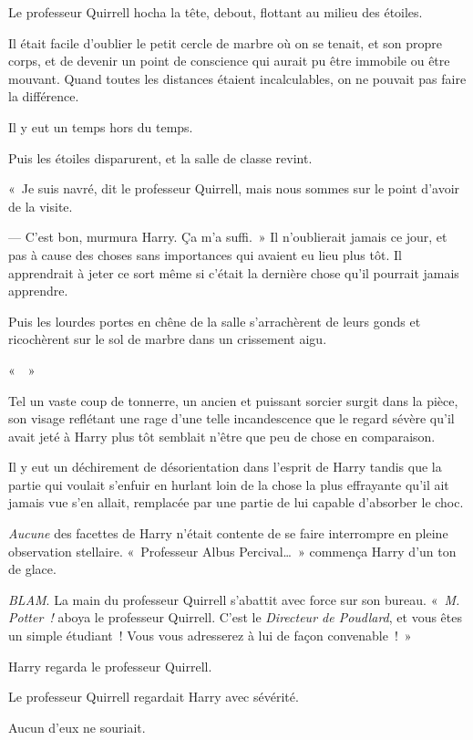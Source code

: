 Le professeur Quirrell hocha la tête, debout, flottant au milieu des étoiles.

Il était facile d'oublier le petit cercle de marbre où on se tenait, et son propre corps, et de devenir un point de conscience qui aurait pu être immobile ou être mouvant. Quand toutes les distances étaient incalculables, on ne pouvait pas faire la différence.

Il y eut un temps hors du temps.

Puis les étoiles disparurent, et la salle de classe revint.

«~Je suis navré, dit le professeur Quirrell, mais nous sommes sur le point d'avoir de la visite.

--- C'est bon, murmura Harry. Ça m'a suffi.~» Il n'oublierait jamais ce jour, et pas à cause des choses sans importances qui avaient eu lieu plus tôt. Il apprendrait à jeter ce sort même si c'était la dernière chose qu'il pourrait jamais apprendre.

Puis les lourdes portes en chêne de la salle s'arrachèrent de leurs gonds et ricochèrent sur le sol de marbre dans un crissement aigu.

«~~»

Tel un vaste coup de tonnerre, un ancien et puissant sorcier surgit dans la pièce, son visage reflétant une rage d'une telle incandescence que le regard sévère qu'il avait jeté à Harry plus tôt semblait n'être que peu de chose en comparaison.

Il y eut un déchirement de désorientation dans l'esprit de Harry tandis que la partie qui voulait s'enfuir en hurlant loin de la chose la plus effrayante qu'il ait jamais vue s'en allait, remplacée par une partie de lui capable d'absorber le choc.

\emph{Aucune} des facettes de Harry n'était contente de se faire interrompre en pleine observation stellaire. «~Professeur Albus Percival…~» commença Harry d'un ton de glace.

\emph{BLAM}. La main du professeur Quirrell s'abattit avec force sur son bureau. «~\emph{M. Potter~!} aboya le professeur Quirrell. C'est le \emph{Directeur de Poudlard}, et vous êtes un simple étudiant~! Vous vous adresserez à lui de façon convenable~!~»

Harry regarda le professeur Quirrell.

Le professeur Quirrell regardait Harry avec sévérité.

Aucun d'eux ne souriait.


